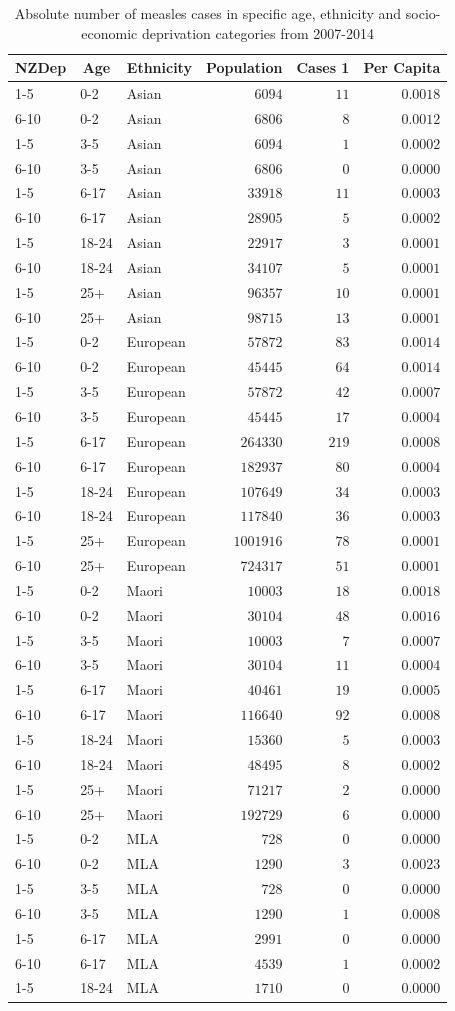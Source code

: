 \documentclass{article}
\begin{document}
\begin{table}\tiny
\caption{Absolute number of measles cases in specific age, ethnicity and socio-economic deprivation categories from 2007-2014}
\begin{center}
\begin{tabular}{lllrrr}
\hline\hline
\multicolumn{1}{c}{NZDep}&\multicolumn{1}{c}{Age}&\multicolumn{1}{c}{Ethnicity}&\multicolumn{1}{c}{Population}&\multicolumn{1}{c}{Cases 1}&\multicolumn{1}{c}{Per Capita}\tabularnewline
\hline
1-5&0-2&Asian&$   6094$&$ 11$&$0.0018$\tabularnewline
6-10&0-2&Asian&$   6806$&$  8$&$0.0012$\tabularnewline
1-5&3-5&Asian&$   6094$&$  1$&$0.0002$\tabularnewline
6-10&3-5&Asian&$   6806$&$  0$&$0.0000$\tabularnewline
1-5&6-17&Asian&$  33918$&$ 11$&$0.0003$\tabularnewline
6-10&6-17&Asian&$  28905$&$  5$&$0.0002$\tabularnewline
1-5&18-24&Asian&$  22917$&$  3$&$0.0001$\tabularnewline
6-10&18-24&Asian&$  34107$&$  5$&$0.0001$\tabularnewline
1-5&25+&Asian&$  96357$&$ 10$&$0.0001$\tabularnewline
6-10&25+&Asian&$  98715$&$ 13$&$0.0001$\tabularnewline
1-5&0-2&European&$  57872$&$ 83$&$0.0014$\tabularnewline
6-10&0-2&European&$  45445$&$ 64$&$0.0014$\tabularnewline
1-5&3-5&European&$  57872$&$ 42$&$0.0007$\tabularnewline
6-10&3-5&European&$  45445$&$ 17$&$0.0004$\tabularnewline
1-5&6-17&European&$ 264330$&$219$&$0.0008$\tabularnewline
6-10&6-17&European&$ 182937$&$ 80$&$0.0004$\tabularnewline
1-5&18-24&European&$ 107649$&$ 34$&$0.0003$\tabularnewline
6-10&18-24&European&$ 117840$&$ 36$&$0.0003$\tabularnewline
1-5&25+&European&$1001916$&$ 78$&$0.0001$\tabularnewline
6-10&25+&European&$ 724317$&$ 51$&$0.0001$\tabularnewline
1-5&0-2&Maori&$  10003$&$ 18$&$0.0018$\tabularnewline
6-10&0-2&Maori&$  30104$&$ 48$&$0.0016$\tabularnewline
1-5&3-5&Maori&$  10003$&$  7$&$0.0007$\tabularnewline
6-10&3-5&Maori&$  30104$&$ 11$&$0.0004$\tabularnewline
1-5&6-17&Maori&$  40461$&$ 19$&$0.0005$\tabularnewline
6-10&6-17&Maori&$ 116640$&$ 92$&$0.0008$\tabularnewline
1-5&18-24&Maori&$  15360$&$  5$&$0.0003$\tabularnewline
6-10&18-24&Maori&$  48495$&$  8$&$0.0002$\tabularnewline
1-5&25+&Maori&$  71217$&$  2$&$0.0000$\tabularnewline
6-10&25+&Maori&$ 192729$&$  6$&$0.0000$\tabularnewline
1-5&0-2&MLA&$    728$&$  0$&$0.0000$\tabularnewline
6-10&0-2&MLA&$   1290$&$  3$&$0.0023$\tabularnewline
1-5&3-5&MLA&$    728$&$  0$&$0.0000$\tabularnewline
6-10&3-5&MLA&$   1290$&$  1$&$0.0008$\tabularnewline
1-5&6-17&MLA&$   2991$&$  0$&$0.0000$\tabularnewline
6-10&6-17&MLA&$   4539$&$  1$&$0.0002$\tabularnewline
1-5&18-24&MLA&$   1710$&$  0$&$0.0000$\tabularnewline

\end{tabular}
\end{center}
\end{table}
\end{document}
